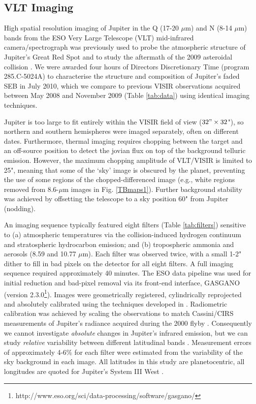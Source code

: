 \documentclass[final,5p,times,twocolumn,authoryear]{elsarticle}
\begin{document}
\subsection{VLT Imaging}

High spatial resolution imaging of Jupiter in the Q (17-20 $\mu$m) and N (8-14 $\mu$m) bands from the ESO Very Large Telescope (VLT) mid-infrared camera/spectrograph \citep[VISIR,][]{04lagage} was previously used to probe the atmospheric structure of Jupiter's Great Red Spot \citep{10fletcher_grs} and to study the aftermath of the 2009 asteroidal collision \citep{11orton, 10fletcher_cxhy}.  We were awarded four hours of Directors Discretionary Time (program 285.C-5024A) to characterise the structure and composition of Jupiter's faded SEB in July 2010, which we compare to previous VISIR observations acquired between May 2008 and November 2009 (Table \ref{tab:data}) using identical imaging techniques.  

Jupiter is too large to fit entirely within the VISIR field of view ($32"\times32$"), so northern and southern hemispheres were imaged separately, often on different dates.   Furthermore, thermal imaging requires chopping between the target and an off-source position to detect the jovian flux on top of the background telluric emission.   However, the maximum chopping amplitude of VLT/VISIR is limited to 25", meaning that some of the `sky' image is obscured by the planet, preventing the use of some regions of the chopped-differenced image (e.g., white regions removed from 8.6-$\mu$m images in Fig. \ref{TBmaps1}).  Further background stability was achieved by offsetting the telescope to a sky position 60" from Jupiter (nodding).

An imaging sequence typically featured eight filters (Table \ref{tab:filters}) sensitive to (a) atmospheric temperatures via the collision-induced hydrogen continuum and stratospheric hydrocarbon emission; and (b) tropospheric ammonia and aerosols (8.59 and 10.77 $\mu$m).  Each filter was observed twice, with a small 1-2" dither to fill in bad pixels on the detector for all eight filters.  A full imaging sequence required approximately 40 minutes.  The ESO data pipeline was used for initial reduction and bad-pixel removal via its front-end interface, GASGANO (version 2.3.0\footnote{http://www.eso.org/sci/data-processing/software/gasgano/}).  Images were geometrically registered, cylindrically reprojected and absolutely calibrated using the techniques developed in \citet{09fletcher_imaging}.  Radiometric calibration was achieved by scaling the observations to match Cassini/CIRS measurements of Jupiter's radiance acquired during the 2000 flyby \citep{04flasar_jupiter}.  Consequently we cannot investigate \textit{absolute} changes in Jupiter's infrared emission, but we can study \textit{relative} variability between different latitudinal bands \citep[see ][for a complete discussion]{09fletcher_imaging}.  Measurement errors of approximately 4-6\% for each filter were estimated from the variability of the sky background in each image.  All latitudes in this study are planetocentric, all longitudes are quoted for Jupiter's System III West \citep[using the standard IAU definition of System III rotation (1965), recently reviewed by][]{10russell}.
\end{document}
